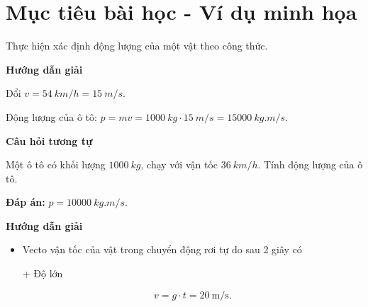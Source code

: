\section{Mục tiêu bài học - Ví dụ minh họa}
\begin{dang}{Thực hiện xác định động lượng của một vật theo công thức.}
	{	\begin{center}
			\textbf{Hướng dẫn giải}
		\end{center}
		
		Đổi $v=\SI{54}{km/h} = \SI{15}{m/s}$.
		
		Động lượng của ô tô:
		$p = mv =\SI{1000}{kg} \cdot \SI{15}{m/s}= \SI{15000}{kg.m/s}$.
		
	\begin{center}
	\textbf{Câu hỏi tương tự}
	\end{center}

	Một ô tô có khối lượng $\SI{1000}{kg}$, chạy với vận tốc $\SI{36}{km/h}$. Tính động lượng của ô tô.
	
	\textbf{Đáp án:} $p=\SI{10000}{kg.m/s}$.
	}
	{	\begin{center}
			\textbf{Hướng dẫn giải}
		\end{center}
		
		\begin{itemize}
			\item Vecto vận tốc của vật trong chuyển động rơi tự do sau 2 giây có
			
			+ Độ lớn 
			
			\begin{equation*}
				v=g \cdot t = 20 \ \text{m/s}.
			\end{equation*}
			

\end{itemize}}
\end{dang}
